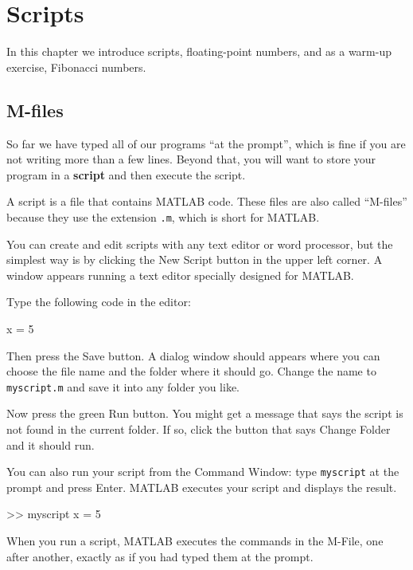 \documentclass[main.tex]{subfiles}
\begin{document}
\chapter{Scripts}

In this chapter we introduce scripts, floating-point numbers, and as a warm-up exercise, Fibonacci numbers.


\section{M-files}

So far we have typed all of our programs ``at the prompt'', which is
fine if you are not writing more than a few lines.  Beyond that,
you will want to store your program in a {\bf script} and then
execute the script.


A script is a file that contains MATLAB code.  These files are
also called ``M-files'' because they use the extension {\tt .m},
which is short for MATLAB.

You can create and edit scripts with any text editor or word processor, but the simplest way is by clicking the {\sf New Script} button in the upper left corner.  A window appears running a text editor specially designed for MATLAB.

Type the following code in the editor:

\begin{code}
x = 5
\end{code}

Then press the {\sf Save} button.  A dialog window should appears where you
can choose the file name and the folder where it should go.  Change
the name to {\tt myscript.m} and save it into any folder you like.

Now press the green {\sf Run} button.  You might get a message that says the script is not found in the current folder.  
If so, click the button that says {\sf Change Folder} and it should run.


You can also run your script from the Command Window: type {\tt myscript} at the prompt and press Enter.  
MATLAB executes your script and displays the result.

\begin{code}
>> myscript
x = 5
\end{code}

When you run a script, MATLAB executes the commands in the M-File, one
after another, exactly as if you had typed them at the prompt.
\end{document}
